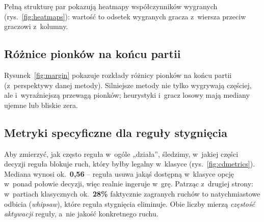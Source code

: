 \documentclass[12pt,a4paper]{article}
\begin{document}
\begin{figure}[H]\centering
\begin{minipage}[c]{0.57\textwidth}\centering
\resizebox{\linewidth}{!}{}
\label{fig:ranking}
\end{minipage}\hfill
\begin{minipage}[c]{0.40\textwidth}\centering\small
{}\label{tab:ranking}
\vspace{3pt}

\end{minipage}
\end{figure}

Pełną strukturę par pokazują heatmapy współczynników wygranych (rys.~\ref{fig:heatmaps}): wartość
to odsetek wygranych gracza z~wiersza przeciw graczowi z~kolumny.



\subsection{Różnice pionków na końcu partii}
Rysunek~\ref{fig:margin} pokazuje rozkłady różnicy pionków na końcu partii (z~perspektywy danej
metody). Silniejsze metody nie tylko wygrywają częściej, ale i~wyraźniejszą przewagą pionków;
heurystyki i~gracz losowy mają mediany ujemne lub bliskie zera.



\subsection{Metryki specyficzne dla reguły stygnięcia}
Aby zmierzyć, jak często reguła w~ogóle „działa”, śledzimy, w~jakiej części decyzji reguła blokuje
ruch, który byłby legalny w~klasyce (rys.~\ref{fig:cdmetrics}). Mediana wynosi ok.\ \textbf{0,56} --
reguła usuwa jakąś dostępną w~klasyce opcję w~ponad połowie decyzji, więc realnie ingeruje w~grę.
Patrząc z~drugiej strony: w~partiach klasycznych ok.\ \textbf{28\%} faktycznie zagranych ruchów to
natychmiastowe odbicia (\emph{whipsaw}), które reguła stygnięcia eliminuje. Obie liczby mierzą
\emph{częstość aktywacji} reguły, a~nie jakość konkretnego ruchu.


\end{document}
